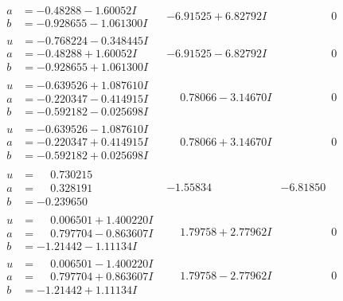 \documentclass[1p]{elsarticle_modified}
\theoremstyle{definition}
\begin{document}
$$\begin{array}{c|c|c}
\begin{aligned}
a &= -0.48288 - 1.60052 I \\
b &= -0.928655 - 1.061300 I\end{aligned}
 & -6.91525 + 6.82792 I & \phantom{-0.000000 } 0 \\ \hline\begin{aligned}
u &= -0.768224 - 0.348445 I \\
a &= -0.48288 + 1.60052 I \\
b &= -0.928655 + 1.061300 I\end{aligned}
 & -6.91525 - 6.82792 I & \phantom{-0.000000 } 0 \\ \hline\begin{aligned}
u &= -0.639526 + 1.087610 I \\
a &= -0.220347 - 0.414915 I \\
b &= -0.592182 - 0.025698 I\end{aligned}
 & \phantom{-}0.78066 - 3.14670 I & \phantom{-0.000000 } 0 \\ \hline\begin{aligned}
u &= -0.639526 - 1.087610 I \\
a &= -0.220347 + 0.414915 I \\
b &= -0.592182 + 0.025698 I\end{aligned}
 & \phantom{-}0.78066 + 3.14670 I & \phantom{-0.000000 } 0 \\ \hline\begin{aligned}
u &= \phantom{-}0.730215\phantom{ +0.000000I} \\
a &= \phantom{-}0.328191\phantom{ +0.000000I} \\
b &= -0.239650\phantom{ +0.000000I}\end{aligned}
 & -1.55834\phantom{ +0.000000I} & -6.81850\phantom{ +0.000000I} \\ \hline\begin{aligned}
u &= \phantom{-}0.006501 + 1.400220 I \\
a &= \phantom{-}0.797704 - 0.863607 I \\
b &= -1.21442 - 1.11134 I\end{aligned}
 & \phantom{-}1.79758 + 2.77962 I & \phantom{-0.000000 } 0 \\ \hline\begin{aligned}
u &= \phantom{-}0.006501 - 1.400220 I \\
a &= \phantom{-}0.797704 + 0.863607 I \\
b &= -1.21442 + 1.11134 I\end{aligned}
 & \phantom{-}1.79758 - 2.77962 I & \phantom{-0.000000 } 0 \\ \hline\begin{aligned}

\end{aligned}
\end{array}$$
\end{document}
